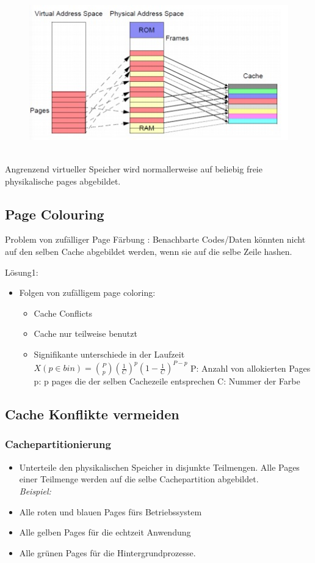 \documentclass[a4paper]{scrreprt}
\begin{document}
\begin{figure}[ht]
\centering
\includegraphics[scale=0.5]{graphics/pageconflict.png}
\end{figure}
 \ \\
Angrenzend virtueller Speicher wird normallerweise auf beliebig freie physikalische pages abgebildet.

\subsection{Page Colouring}
Problem von zufälliger Page Färbung : Benachbarte Codes/Daten könnten nicht auf den selben Cache abgebildet werden, wenn sie auf die selbe Zeile hashen.

Lösung1: 

\begin{itemize}
\item Folgen von zufälligem page coloring:
\begin{itemize}
\item Cache Conflicts
\item Cache nur teilweise benutzt
\item Signifikante unterschiede in der Laufzeit \\
$X(p \in bin) = {P \choose p} (\frac{1}{C})^p(1-\frac{1}{C})^{P-p} $
P: Anzahl von allokierten Pages
p: p pages die der selben Cachezeile entsprechen
C: Nummer der Farbe
\end{itemize}
\end{itemize}


\subsection{Cache Konflikte vermeiden}
\subsubsection{Cachepartitionierung}
\begin{itemize}
\item Unterteile den physikalischen Speicher in disjunkte  Teilmengen. Alle Pages einer Teilmenge werden auf die selbe Cachepartition abgebildet.\\
\textit{Beispiel:} \\
\item Alle roten und blauen Pages fürs Betriebssystem
\item Alle gelben Pages für die echtzeit Anwendung
\item Alle grünen Pages für die Hintergrundprozesse.
\end{itemize}
\end{document}
